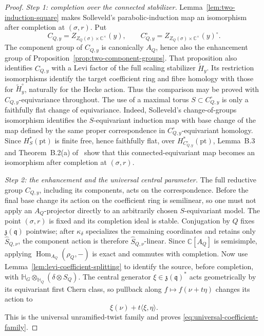 \documentclass[11pt]{amsart}
\theoremstyle{definition}
\theoremstyle{remark}
\newcommand{\Hh}{\mathbb H}
\begin{document}
\begin{proof}
\smallskip
\noindent\emph{Step 1: completion over the connected stabilizer.}
Lemma~\ref{lem:two-induction-square} makes Solleveld's parabolic-induction map
an isomorphism after completion at $(\sigma,r)$.  Put
\[
 C_{Q,y}=Z_{Z_Q(\sigma)\times\mathbb C^\times}(y),\qquad
 C_{Q,y}^{\circ}=Z_{Z_Q(\sigma)\times\mathbb C^\times}(y)^{\circ}.
\]
The component group of $C_{Q,y}$ is canonically $A_Q$, hence also the enhancement group
of Proposition~\ref{prop:two-component-groups}.  That proposition also
identifies $C_{Q,y}$ with a Levi factor of the full scaling stabilizer
$\widetilde H_y$.  Its restriction isomorphisms identify the target
coefficient ring and fibre homology with those for
$\widetilde H_y^\circ$, naturally for the Hecke action.  Thus the
comparison may be proved with $C_{Q,y}$-equivariance throughout.
The use of a maximal torus
$S\subset C_{Q,y}^{\circ}$ is only a faithfully flat change of equivariance.
Indeed, Solleveld's change-of-groups isomorphism
\cite[equation~(B.1)]{Solleveld}
identifies the $S$-equivariant induction map with base change of the map
defined by the same proper correspondence in
$C_{Q,y}^{\circ}$-equivariant homology.  Since
$H_S^*(\mathrm{pt})$ is finite free, hence faithfully flat, over
$H_{C_{Q,y}^{\circ}}^*(\mathrm{pt})$, Lemma~B.3 and
Theorem~B.2(a) of~\cite{Solleveld} show that this connected-equivariant map
becomes an isomorphism after completion at $(\sigma,r)$.

\smallskip
\noindent\emph{Step 2: the enhancement and the universal central parameter.}
The full reductive group $C_{Q,y}$, including its components, acts on the
correspondence.  Before the final base
change its action on the coefficient ring is semilinear, so one must not
apply an $A_Q$-projector directly to an arbitrarily chosen
$S$-equivariant model.  The point $(\sigma,r)$ is fixed and its completion
ideal is stable.  Conjugation by $Q$ fixes $\mathfrak z(\mathfrak q)$
pointwise; after $\kappa_\delta$ specializes the remaining coordinates and
retains only $\widehat S_{Q,\nu}$, the component action is therefore
$\widehat S_{Q,\nu}$-linear.  Since $\mathbb C[A_Q]$ is semisimple, applying
$\operatorname{Hom}_{A_Q}(\rho_Q,-)$ is exact and commutes with completion.
Now use Lemma~\ref{lem:levi-coefficient-splitting} to identify the source,
before completion, with
$\Hh_G\otimes_{\Hh_Q}(\delta\otimes S_Q)$.  The central generator
$\xi\in\mathfrak z(\mathfrak q)^*$ acts geometrically by its equivariant
first Chern class, so pullback along $f\mapsto f(\nu+t\eta)$ changes its action
to
\[
 \xi(\nu)+t\langle\xi,\eta\rangle.
\]
This is the universal unramified-twist family and proves
\eqref{eq:universal-coefficient-family}.


\end{proof}
\end{document}
